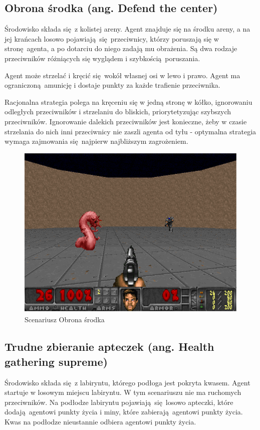 \subsection{Obrona środka (ang. Defend the center)}\label{scenario_dtc}
Środowisko składa się z kolistej areny. Agent znajduje się na środku areny, a na jej krańcach losowo pojawiają się przeciwnicy, którzy poruszają się w stronę agenta, a po dotarciu do niego zadają mu obrażenia. Są dwa rodzaje przeciwników różniących się wyglądem i szybkością poruszania.

Agent może strzelać i kręcić się wokół własnej osi w lewo i prawo. Agent ma ograniczoną amunicję i dostaje punkty za każde trafienie przeciwnika.

Racjonalna strategia polega na kręceniu się w jedną stronę w kółko, ignorowaniu odległych przeciwników i strzelaniu do bliskich, priorytetyzując szybszych przeciwników. Ignorowanie dalekich przeciwników jest konieczne, żeby w czasie strzelania do nich inni przeciwnicy nie zaszli agenta od tyłu - optymalna strategia wymaga zajmowania się najpierw najbliższym zagrożeniem.

\begin{center}
\begin{figure}[H]
\includegraphics[scale = 0.4]{figures/screens/scenarios/dtc.png}{\caption{Scenariusz Obrona środka}\label{fig:scenario_dtc}}
\end{figure}
\end{center}

\subsection{Trudne zbieranie apteczek (ang. Health gathering supreme) }\label{scenario_hgs}
Środowisko składa się z labiryntu, którego podłoga jest pokryta kwasem. Agent startuje w losowym miejscu labiryntu. W tym scenariuszu nie ma ruchomych przeciwników. Na podłodze labiryntu pojawiają się losowo apteczki, które dodają agentowi punkty życia i miny, które zabierają agentowi punkty życia. Kwas na podłodze nieustannie odbiera agentowi punkty życia. 


